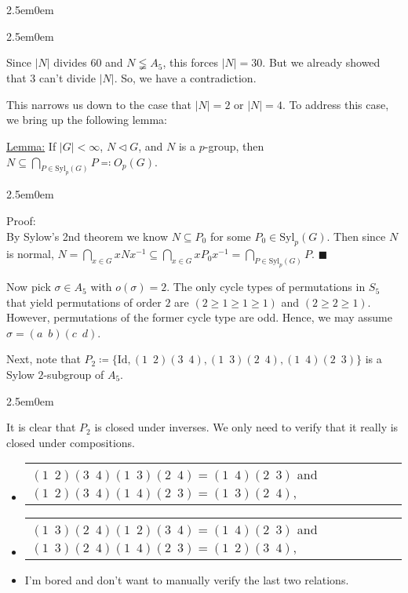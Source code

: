 \documentclass{book}
\newcommand{\exPPP}{%
   \color{VioletRed}%
   \fontsize{12}{14}\selectfont%
}
\newenvironment{myIndent}{%
   \begin{adjustwidth}{2.5em}{0em}%
}{%
   \end{adjustwidth}%
}
\newcommand{\gap}{\phantom{2}}
\newcommand{\myId}{\mathrm{Id}}
\newcommand{\Syl}{\mathrm{Syl}}
\newcommand{\retTwo}{\hfill\bigbreak}
\begin{document}
\begin{myIndent}
\begin{myIndent}
		Since $|N|$ divides $60$ and $N \lneqq A_5$, this forces $|N| = 30$. But we already showed that $3$ can't divide $|N|$. So, we have a contradiction.\retTwo
	\end{myIndent}

	This narrows us down to the case that $|N| = 2$ or $|N| = 4$. To address this case, we bring up the following lemma:\retTwo

	\ul{Lemma:} If $|G| < \infty$, $N \lhd G$, and $N$ is a $p$-group, then $N \subseteq \bigcap_{P \in \Syl_p(G)} P \eqqcolon O_p(G)$.
	\begin{myIndent}\exPPP
		Proof:\\
		By Sylow's 2nd theorem we know $N \subseteq P_0$ for some $P_0 \in \Syl_p(G)$. Then since $N$ is normal, $N = \bigcap_{x \in G} xN x^{-1} \subseteq \bigcap_{x \in G} xP_0 x^{-1} = \bigcap_{P \in \Syl_p(G)} P$. $\blacksquare$\retTwo
	\end{myIndent}

	Now pick $\sigma \in A_5$ with $o(\sigma) = 2$. The only cycle types of permutations in $S_5$ that yield permutations of order $2$ are $(2 \geq 1 \geq 1 \geq 1)$ and $(2 \geq 2 \geq 1)$. However, permutations of the former cycle type are odd. Hence, we may assume $\sigma = (a\gap b)(c \gap d)$.\retTwo

	Next, note that $P_2 \coloneqq \{\myId, (1\gap 2)(3 \gap 4), (1\gap 3)(2 \gap 4), (1\gap 4)(2 \gap 3)\}$ is a Sylow $2$-subgroup of $A_5$.
	\begin{myIndent}\exPPP
		It is clear that $P_2$ is closed under inverses. We only need to verify that it really is closed under compositions.
		\begin{itemize}
			\item \begin{tabular}{l}
				$(1\gap 2)(3 \gap 4)(1 \gap 3)(2 \gap 4) =(1 \gap 4) (2\gap 3)$ and $(1\gap 2)(3 \gap 4)(1 \gap 4)(2 \gap 3) =(1 \gap 3) (2\gap 4)$,
			\end{tabular}

			\item \begin{tabular}{l}
				$(1\gap 3)(2 \gap 4)(1 \gap 2)(3 \gap 4) =(1 \gap 4) (2\gap 3)$ and $(1\gap 3)(2 \gap 4)(1\gap 4)(2 \gap 3) = (1\gap 2)(3 \gap 4)$,
			\end{tabular}

			\item I'm bored and don't want to manually verify the last two relations.\retTwo
		\end{itemize}
	\end{myIndent}


\end{myIndent}
\end{document}
